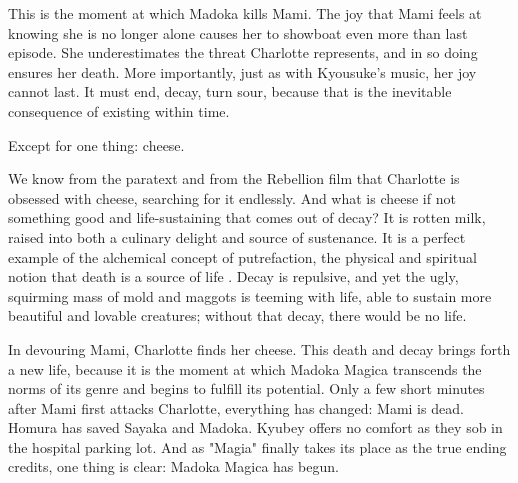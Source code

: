 This is the moment at which Madoka kills Mami. The joy that Mami feels at knowing she is no longer alone causes her to showboat even more than last episode. She underestimates the threat Charlotte represents, and in so doing ensures her death. More importantly, just as with Kyousuke's music, her joy cannot last. It must end, decay, turn sour, because that is the inevitable consequence of existing within time.

Except for one thing: cheese.

We know from the paratext and from the Rebellion film that Charlotte is obsessed with cheese, searching for it endlessly. And what is cheese if not something good and life-sustaining that comes out of decay? It is rotten milk, raised into both a culinary delight and source of sustenance. It is a perfect example of the alchemical concept of putrefaction, the physical and spiritual notion that death is a source of life \cite{ref36}. Decay is repulsive, and yet the ugly, squirming mass of mold and maggots is teeming with life, able to sustain more beautiful and lovable creatures; without that decay, there would be no life. 

In devouring Mami, Charlotte finds her cheese. This death and decay brings forth a new life, because it is the moment at which Madoka Magica transcends the norms of its genre and begins to fulfill its potential. Only a few short minutes after Mami first attacks Charlotte, everything has changed: Mami is dead. Homura has saved Sayaka and Madoka. Kyubey offers no comfort as they sob in the hospital parking lot. And as "Magia" finally takes its place as the true ending credits, one thing is clear: Madoka Magica has begun.
